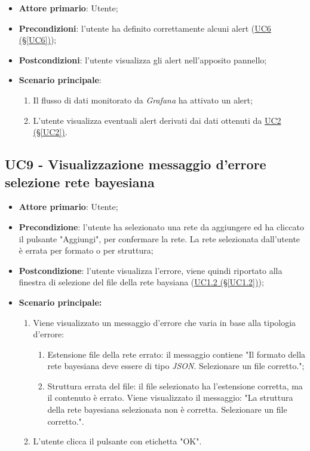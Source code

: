 \begin{itemize}
	\item \textbf{Attore primario}: Utente;
	\item \textbf{Precondizioni}: l'utente ha definito correttamente alcuni alert (\hyperref[UC6]{UC6 											(§\ref*{UC6})});
	\item \textbf{Postcondizioni}: l'utente visualizza gli alert nell'apposito pannello;
	\item \textbf{Scenario principale}:
	\begin{enumerate}
		\item Il flusso di dati monitorato da \textit{Grafana} ha attivato un alert;
		\item L'utente visualizza eventuali alert derivati dai dati ottenuti da  \hyperref[UC2]{UC2 (§\ref*{UC2})}.
	\end{enumerate}
\end{itemize}

\pagebreak

\subsection{UC9 - Visualizzazione messaggio d'errore selezione  rete bayesiana}\label{UC9}
\begin{itemize}
\item \textbf{Attore primario}: Utente;
\item \textbf{Precondizione}: l'utente ha selezionato una rete da aggiungere ed ha cliccato il pulsante "Aggiungi", per confermare la rete. La rete selezionata dall'utente è errata per formato o per struttura;
\item \textbf{Postcondizione}: l'utente visualizza l'errore, viene quindi riportato alla finestra di selezione del file della rete baysiana (\hyperref[UC1.2]{UC1.2 (§\ref*{UC1.2})});
\item \textbf{Scenario principale:} 
	\begin{enumerate}
		\item Viene visualizzato un messaggio d'errore che varia in base alla tipologia d'errore:
			\begin{enumerate}
				\item Estensione file della rete errato: il messaggio contiene "Il formato della rete bayesiana deve essere di tipo \textit{JSON}. Selezionare un file corretto.";
				\item Struttura errata del file: il file selezionato ha l'estensione corretta, ma il contenuto è errato. Viene visualizzato il messaggio: "La struttura della rete bayesiana selezionata non è corretta. Selezionare un file corretto.".
			\end{enumerate}
		\item L'utente clicca il pulsante con etichetta "OK".
	\end{enumerate}
\end{itemize}

